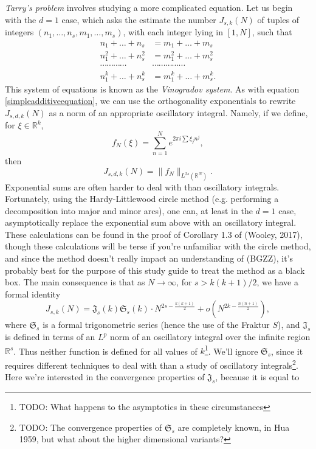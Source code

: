 \documentclass[12pt]{article}
\newcommand{\R}{\mathbb{R}}
\theoremstyle{definition}
\theoremstyle{remark}
\numberwithin{equation}{section}
\begin{document}
	\emph{Tarry's problem} involves studying a more complicated equation. Let us begin with the $d = 1$ case, which asks the estimate the number $J_{s,k}(N)$ of tuples of integers $(n_1,\dots,n_s,m_1,\dots,m_s)$, with each integer lying in $[1,N]$, such that
	\begin{align*}
		n_1 + \dots + n_s &= m_1 + \dots + m_s\\
		n_1^2 + \dots + n_s^2 &= m_1^2 + \dots + m_s^2\\
		\cdots \cdots \cdots \cdots & \cdots \cdots \cdots \cdots \cdots\\
		n_1^k + \dots + n_s^k &= m_1^k + \dots + m_s^k.
	\end{align*}
    This system of equations is known as the \emph{Vinogradov system}. As with equation \eqref{simpleadditiveequation}, we can use the orthogonality exponentials to rewrite $J_{s,d,k}(N)$ as a norm of an appropriate oscillatory integral. Namely, if we define, for $\xi \in \R^k$,
  	\[ f_N(\xi) = \sum_{n = 1}^N e^{2 \pi i \sum \xi_j n^j}, \]
   then
  	\[ J_{s,d,k}(N) = \| f_N \|_{L^{2s}(\R^N)}. \]
  	Exponential sums are often harder to deal with than oscillatory integrals. Fortunately, using the Hardy-Littlewood circle method (e.g. performing a decomposition into major and minor arcs), one can, at least in the $d = 1$ case, asymptotically replace the exponential sum above with an oscillatory integral. These calculations can be found in the proof of Corollary 1.3 of (Wooley, 2017), though these calculations will be terse if you're unfamiliar with the circle method, and since the method doesn't really impact an understanding of (BGZZ), it's probably best for the purpose of this study guide to treat the method as a black box. The main consequence is that as $N \to \infty$, for $s > k(k+1)/2$, we have a formal identity
	\[ J_{s,k}(N) = \mathfrak{J}_s(k) \mathfrak{S}_s(k) \cdot N^{2s - \frac{k(k+1)}{2}} + o \left( N^{2k - \frac{n(n+1)}{2}} \right), \]
	where $\mathfrak{S}_s$ is a formal trigonometric series (hence the use of the Fraktur $S$), and $\mathfrak{J}_s$ is defined in terms of an $L^p$ norm of an oscillatory integral over the infinite region $\R^s$. Thus neither function is defined for all values of $k$\footnote{TODO: What happens to the asymptotics in these circumstances}. We'll ignore $\mathfrak{S}_s$, since it requires different techniques to deal with than a study of oscillatory integrals\footnote{TODO: The convergence properties of $\mathfrak{S}_s$ are completely known, in Hua 1959, but what about the higher dimensional variants?}. Here we're interested in the convergence properties of $\mathfrak{J}_s$, because it is equal to
\end{document}
